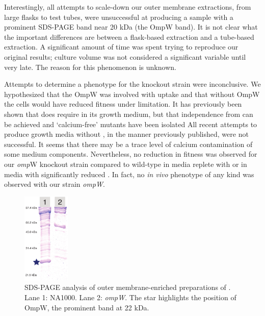 Interestingly, all attempts to scale-down our outer membrane extractions, from large flasks to test tubes, were unsuccessful at producing a sample with a prominent \ac{SDS-PAGE} band near 20 kDa (the OmpW band). It is not clear what the important differences are between a flask-based extraction and a tube-based extraction. A significant amount of time was spent trying to reproduce our original results; culture volume was not considered a significant variable until very late. The reason for this phenomenon is unknown.

Attempts to determine a phenotype for the knockout strain were inconclusive. We hypothesized that the OmpW was involved with  uptake and that without OmpW the cells would have reduced fitness under  limitation. It has previously been shown that \caulobacter does require  in its growth medium, but that independence from  can be achieved and  `calcium-free' mutants have been isolated All recent attempts to produce growth media without , in the manner previously published, were not successful. It seems that there may be a trace level of calcium contamination of some medium components. Nevertheless, no reduction in fitness was observed for our \textit{omp}W knockout strain compared to wild-type in media replete with  or in media with significantly reduced . In fact, no \textit{in vivo} phenotype of any kind was observed with our strain \caulobacter \del \textit{ompW}.

\begin{figure}[htb]
  	\begin{center}
   		\includegraphics[width=0.2\textwidth]{porin_chapter/img/Fig-knockout.pdf}
   	\end{center}
   	\caption[\ac{SDS-PAGE} of \caulobacter \del \textit{ompW}]{\ac{SDS-PAGE} analysis of outer membrane-enriched  preparations of \caulobacter. Lane 1: \caulobacter NA1000. Lane 2: \caulobacter  \del \textit{ompW}. The star highlights the position of OmpW, the prominent band at 22 kDa. 
   	}
   	\label{fig:porinknockout}
\end{figure}   

